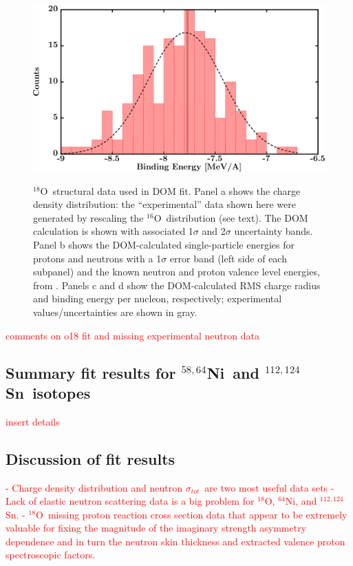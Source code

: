 \documentclass[twocolumn,secnumarabic,amssymb, nobibnotes, aps, prl,
superscriptaddress, nobalancelastpage]{revtex4}
\newcommand{\tot}{\ensuremath{\sigma_{tot}}}
\newcommand{\oSix}{\ensuremath{^{16}}O}
\newcommand{\oEight}{\ensuremath{^{18}}O}
\newcommand{\niFour}{\ensuremath{^{64}}N\lowercase{i}}
\newcommand{\niEightFour}{\ensuremath{^{58,64}}N\lowercase{i}}
\newcommand{\snTwelveFour}{\ensuremath{^{112,124}}S\lowercase{n}}
\begin{document}
\begin{figure}
\begin{minipage}{0.45\textwidth}
        \label{DOM_o18_RMSRadius}
    \end{minipage}
    \begin{minipage}{0.45\textwidth}
        \centering
        \includegraphics[width=\textwidth]{figures/o18_BE.png}
        \label{DOM_o18_BE}
    \end{minipage}
    \caption{\oEight\ structural data used in DOM fit. Panel a shows the charge
        density distribution: the ``experimental'' data shown here were generated
        by rescaling the \oSix\ distribution (see text). The DOM calculation is
        shown with associated 1$\sigma$ and 2$\sigma$ uncertainty bands.
        Panel b shows the DOM-calculated single-particle energies for protons
        and neutrons with a 1$\sigma$ error band (left side of each subpanel) and
        the known neutron and proton valence level energies, from \cite{AME2016}.
        Panels c and d show the DOM-calculated RMS charge radius and binding energy per
    nucleon, respectively; experimental values/uncertainties are shown in gray.}
    \label{DOM_o18_structural}
\end{figure}

\textcolor{red}{comments on o18 fit and missing experimental neutron data}

\subsection{Summary fit results for \niEightFour\ and \snTwelveFour\ isotopes}
\textcolor{red}{insert details}

\subsection{Discussion of fit results}
\textcolor{red}{
- Charge density distribution and neutron \tot\ are two most useful data sets
- Lack of elastic neutron scattering data is a big problem for \oEight, \niFour,
and \snTwelveFour.
- \oEight\ missing proton reaction cross section data that appear to be
extremely valuable for fixing the magnitude of the imaginary strength asymmetry
dependence and in turn the neutron skin thickness and extracted valence proton
spectroscopic factors.
}
\end{document}
